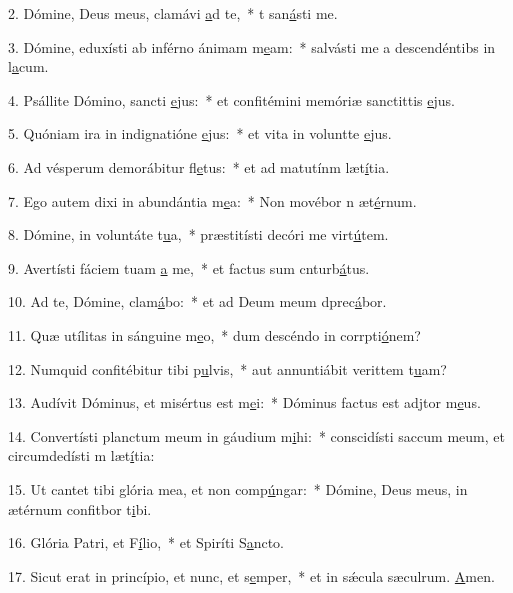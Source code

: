 2. Dómine, Deus meus, clamávi \uline{a}d te,~* t san\uline{á}sti me.\par 
3. Dómine, eduxísti ab inférno ánimam m\uline{e}am:~* salvásti me a descendéntibs in l\uline{a}cum.\par 
4. Psállite Dómino, sancti \uline{e}jus:~* et confitémini memóriæ sanctittis \uline{e}jus.\par 
5. Quóniam ira in indignatióne \uline{e}jus:~* et vita in voluntte \uline{e}jus.\par 
6. Ad vésperum demorábitur fl\uline{e}tus:~* et ad matutínm læt\uline{í}tia.\par 
7. Ego autem dixi in abundántia m\uline{e}a:~* Non movébor n æt\uline{é}rnum.\par 
8. Dómine, in voluntáte t\uline{u}a,~* præstitísti decóri me virt\uline{ú}tem.\par 
9. Avertísti fáciem tuam \uline{a} me,~* et factus sum cnturb\uline{á}tus.\par 
10. Ad te, Dómine, clam\uline{á}bo:~* et ad Deum meum dprec\uline{á}bor.\par 
11. Quæ utílitas in sánguine m\uline{e}o,~* dum descéndo in corrpti\uline{ó}nem?\par 
12. Numquid confitébitur tibi p\uline{u}lvis,~* aut annuntiábit verittem t\uline{u}am?\par 
13. Audívit Dóminus, et misértus est m\uline{e}i:~* Dóminus factus est adjtor m\uline{e}us.\par 
14. Convertísti planctum meum in gáudium m\uline{i}hi:~* conscidísti saccum meum, et circumdedísti m læt\uline{í}tia:\par 
15. Ut cantet tibi glória mea, et non comp\uline{ú}ngar:~* Dómine, Deus meus, in ætérnum confitbor t\uline{i}bi.\par 
16. Glória Patri, et F\uline{í}lio,~* et Spiríti S\uline{a}ncto.\par 
17. Sicut erat in princípio, et nunc, et s\uline{e}mper,~* et in sǽcula sæculrum. \uline{A}men.\par 
